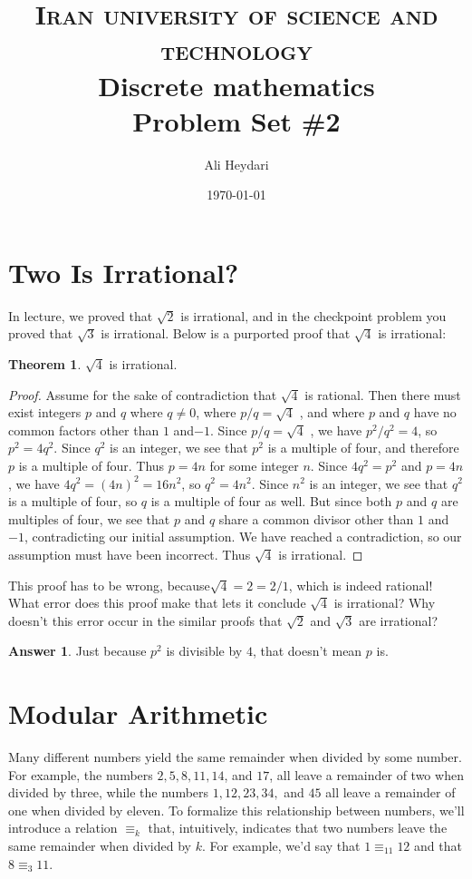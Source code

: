 \documentclass[a4paper]{article}
\title{
\textsc{Iran university of science and technology} \\ [25pt] %
Discrete mathematics\\Problem Set \#2 \\
}
\author{Ali Heydari}
\date{\today}
\renewcommand{\(}{\left(}
\renewcommand{\)}{\right)}
\theoremstyle{plain}
\theoremstyle{plain}
\theoremstyle{definition}
\newtheorem*{answer}{Answer}
\newtheorem{theorem}{Theorem}[section]
\begin{document}
\maketitle

\section{Two Is Irrational?}

In lecture, we proved that $\sqrt{2}$ is irrational, and in the checkpoint problem you proved that $\sqrt{3}$ is irrational.
Below is a purported proof that $\sqrt{4}$ is irrational:

\begin{theorem}
  $\sqrt{4}$  is irrational.
\end{theorem}
\begin{proof}
  Assume for the sake of contradiction that $\sqrt{4}$ is rational. Then there must exist
integers $p$ and $q$ where $ q \neq 0 $, where $p / q = \sqrt{4}$ , and where $p$ and $q$ have no
common factors other than $1$ and$ -1$.
Since $p / q = \sqrt{4}$ , we have $p^2 / q^2 = 4$, so $p^2 = 4q^2$. Since $q^2$ is an integer, we see
that $p^2$ is a multiple of four, and therefore $p$ is a multiple of four. Thus $p = 4n$
for some integer $n$.
Since $4q^2 = p^2$ and $p = 4n$, we have $4q^2 = (4n)^2 = 16n^2$, so $q^2 = 4n^2$. Since $n^2$ is an
integer, we see that $q^2$ is a multiple of four, so $q$ is a multiple of four as well.
But since both $p$ and $q$ are multiples of four, we see that $p$ and $q$ share a common
divisor other than $1$ and $-1$, contradicting our initial assumption. We have
reached a contradiction, so our assumption must have been incorrect. Thus $\sqrt{4}$
is irrational.
\end{proof}
This proof has to be wrong, because$ \sqrt{4} = 2 = 2/1$, which is indeed rational!
What error does this proof make that lets it conclude $\sqrt{4}$ is irrational? Why doesn't this error occur
in the similar proofs that $\sqrt{2}$ and $\sqrt{3}$ are irrational?
\begin{shaded}
\begin{answer}
Just because $p^2$ is divisible by $4$, that doesn't mean $p$ is.
\end{answer}
\end{shaded}

\section{Modular Arithmetic}
Many different numbers yield the same remainder when divided by some number. For example, the
numbers $2, 5, 8, 11, 14$, and $17$, all leave a remainder of two when divided by three, while the numbers
$1, 12, 23, 34,$ and $45$ all leave a remainder of one when divided by eleven. To formalize this relationship
between numbers, we'll introduce a relation $ \equiv_k $  that, intuitively, indicates that two numbers
leave the same remainder when divided by $k$. For example, we'd say that $1 \equiv_{11} 12 $ and that $8 \equiv_3 11$.
\end{document}
